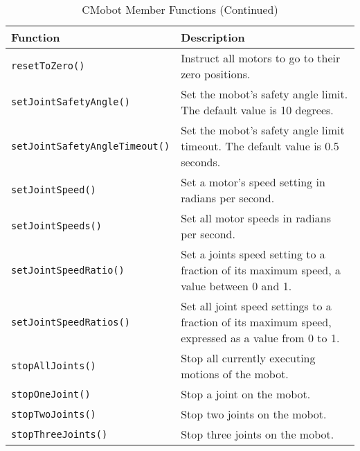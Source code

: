 \begin{table}[!h]
\begin{center}
\caption{CMobot Member Functions (Continued)}
\begin{tabular}{p{48 mm}p{110 mm}}
\hline
Function & Description \\
\hline
\texttt{resetToZero()} & Instruct all motors to go to their zero positions. \\
\texttt{setJointSafetyAngle()} & Set the mobot's safety angle limit. The default value is 10 degrees.\\
\texttt{setJointSafetyAngleTimeout()} & Set the mobot's safety angle limit timeout. The default value is 0.5 seconds.\\
\texttt{setJointSpeed()} & Set a motor's speed setting in radians per second. \\
\texttt{setJointSpeeds()} & Set all motor speeds in radians per second. \\
\texttt{setJointSpeedRatio()} & Set a joints speed setting to a fraction of its maximum speed, a value between 0 and 1. \\
\texttt{setJointSpeedRatios()} & Set all joint speed settings to a fraction of its
maximum speed, expressed as a value from 0 to 1. \\
\texttt{stopAllJoints()} & Stop all currently executing motions of the mobot. \\
\texttt{stopOneJoint()} & Stop a joint on the mobot. \\
\texttt{stopTwoJoints()} & Stop two joints on the mobot. \\
\texttt{stopThreeJoints()} & Stop three joints on the mobot. \\
\hline
\end{tabular}
\end{center}
\label{mobilec_api_cbinary}
\end{table}

